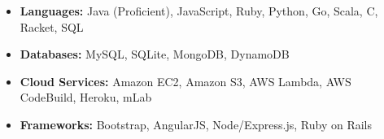 \documentclass[letterpaper,11pt]{article}
\begin{document}
    \begin{itemize}
        \item {
        \textbf{Languages:}
        \vspace{-0.2cm}
        Java (Proficient), JavaScript, Ruby, Python, Go, Scala, C, Racket, SQL
        }
        \item {
        \textbf{Databases:}
        \vspace{-0.2cm}
        MySQL, SQLite, MongoDB, DynamoDB
        }
        \item {
        \textbf{Cloud Services:}
        \vspace{-0.2cm}
        Amazon EC2, Amazon S3, AWS Lambda, AWS CodeBuild, Heroku, mLab
        }
        \item {
        \textbf{Frameworks:}
        Bootstrap, AngularJS, Node/Express.js, Ruby on Rails
        }
    \end{itemize}
\end{document}
